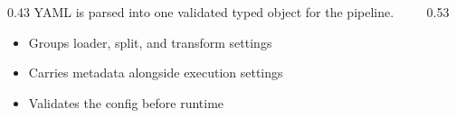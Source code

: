 \begin{frame}

  \vspace{14mm}
  \begin{columns}[T,onlytextwidth]
    \begin{column}{0.43\textwidth}
      {\small YAML is parsed into one validated typed object for the pipeline.}\par
      \vspace{1.5mm}
      \begin{itemize}
        \item Groups loader, split, and transform settings
        \item Carries metadata alongside execution settings
        \item Validates the config before runtime
      \end{itemize}
    \end{column}
    \begin{column}{0.53\textwidth}
      
    \end{column}
  \end{columns}

  \slideheaderfooter
\end{frame}
